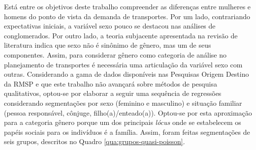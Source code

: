 Está entre os objetivos deste trabalho compreender as diferenças entre mulheres e homens do ponto de vista da demanda de transportes. 
Por um lado, contrariando expectativas iniciais, a variável sexo pouco se destacou nas análises de conglomerados. 
Por outro lado, a teoria subjacente apresentada na revisão de literatura indica que sexo não é sinônimo de gênero, mas um de seus componentes. 
Assim, para considerar gênero como categoria de análise no planejamento de transportes é necessária uma articulação da variável sexo com outras.
Considerando a gama de dados disponíveis nas Pesquisas Origem Destino da RMSP e que este trabalho não avançará sobre métodos de pesquisa qualitativos, optou-se por elaborar a seguir uma sequência de regressões considerando segmentações por sexo (feminino e masculino) e situação familiar (pessoa responsável, cônjuge, filho(a)/enteado(a)).
Optou-se por esta aproximação para a categoria gênero porque um dos principais \textit{lócus} onde se estabelecem os papéis sociais para os indivíduos é a família. 
Assim, foram feitas segmentações de seis grupos, descritos no Quadro \ref{qua:grupos-quasi-poisson}.

\begin{quadro}[htb]
\end{quadro}

